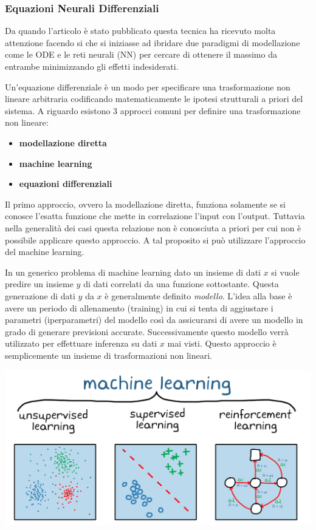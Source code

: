 \subsubsection*{Equazioni Neurali Differenziali}
Da quando l'articolo \cite{chen2019neural} è stato pubblicato questa tecnica
ha ricevuto molta attenzione facendo si che si iniziasse ad ibridare due paradigmi di modellazione come
le ODE e le reti neurali (NN)  per cercare di ottenere il massimo da entrambe minimizzando 
gli effetti indesiderati. \cite{Kim_2021} \cite{chen2019neural}

Un'equazione differenziale è un modo per specificare una trasformazione 
non lineare arbitraria codificando matematicamente le ipotesi strutturali 
a priori del sistema. A riguardo esistono 3 approcci comuni per definire una 
trasformazione non lineare:

\begin{itemize}
    \item \textbf{modellazione diretta}
    \item \textbf{machine learning}
    \item \textbf{equazioni differenziali}
\end{itemize}

Il primo approccio, ovvero la modellazione diretta, funziona solamente se si 
conosce l'esatta funzione che mette in correlazione l'input con l'output. 
Tuttavia nella generalità dei casi questa relazione non è conosciuta a 
priori per cui non è possibile applicare questo approccio. A tal proposito
si può utilizzare l'approccio del machine learning. 

In un generico problema di machine learning dato un insieme di dati $x$ si 
vuole predire un insieme $y$ di dati correlati da una funzione sottostante.
Questa generazione di dati $y$ da $x$ è generalmente definito \emph{modello}. 
L'idea alla base è avere un periodo di allenamento (training) in cui si tenta 
di aggiustare i parametri (iperparametri) del modello così da assicurarsi di 
avere un modello in grado di generare previsioni accurate. Successivamente 
questo modello verrà utilizzato per effettuare inferenza su dati $x$ mai visti. 
Questo approccio è semplicemente un insieme di trasformazioni non lineari. 

\begin{minipage}{\linewidth}
    \centering
    \includegraphics[width=\textwidth]{img/1689243301131.png}
    \label{fig:ML_example}
\end{minipage}

